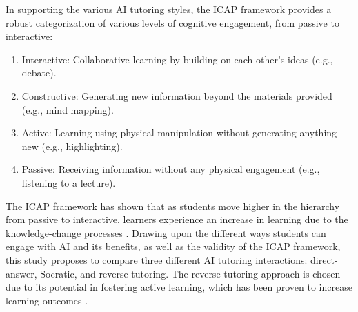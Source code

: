 \documentclass{article}
\begin{document}
In supporting the various AI tutoring styles, the ICAP framework \cite{Chi2014} provides a robust categorization of 
various levels of cognitive engagement, from passive to interactive:
\begin{enumerate}
    \item Interactive: Collaborative learning by building on each other's ideas (e.g., debate).   
    \item Constructive: Generating new information beyond the materials provided (e.g., mind mapping).  
    \item Active: Learning using physical manipulation without generating anything new (e.g., highlighting). 
    \item Passive: Receiving information without any physical engagement (e.g., listening to a lecture).
\end{enumerate}
The ICAP framework has shown that as students move higher in the hierarchy from 
passive to interactive, learners experience an increase in learning due to 
the knowledge-change processes \cite{Chi2014}. Drawing upon the different ways 
students can engage with AI and its benefits, as well as the validity 
of the ICAP framework, this study proposes to compare three different AI tutoring interactions:
direct-answer, Socratic, and reverse-tutoring. The reverse-tutoring approach is chosen 
due to its potential in fostering active learning, which has been proven to increase 
learning outcomes \cite{Chi2014}.
\end{document}

